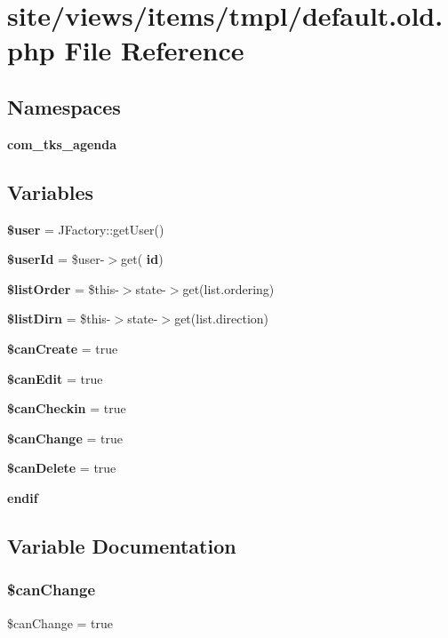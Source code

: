 \section{site/views/items/tmpl/default.old.\+php File Reference}
\label{default_8old_8php}
\subsection*{Namespaces}
\begin{DoxyCompactItemize}
\item 
 \textbf{ com\+\_\+tks\+\_\+agenda}
\end{DoxyCompactItemize}
\subsection*{Variables}
\begin{DoxyCompactItemize}
\item 
\textbf{ \$user} = J\+Factory\+::get\+User()
\item 
\textbf{ \$user\+Id} = \$user-\/$>$get(\textquotesingle{}\textbf{ id}\textquotesingle{})
\item 
\textbf{ \$list\+Order} = \$this-\/$>$state-\/$>$get(\textquotesingle{}list.\+ordering\textquotesingle{})
\item 
\textbf{ \$list\+Dirn} = \$this-\/$>$state-\/$>$get(\textquotesingle{}list.\+direction\textquotesingle{})
\item 
\textbf{ \$can\+Create} = true
\item 
\textbf{ \$can\+Edit} = true
\item 
\textbf{ \$can\+Checkin} = true
\item 
\textbf{ \$can\+Change} = true
\item 
\textbf{ \$can\+Delete} = true
\item 
\textbf{ endif}
\end{DoxyCompactItemize}


\subsection{Variable Documentation}
\mbox{\label{default_8old_8php_a5baed5c5102e35aea5e62f18b474dc3f}} 
\subsubsection{\$can\+Change}
{\footnotesize\ttfamily \$can\+Change = true}

